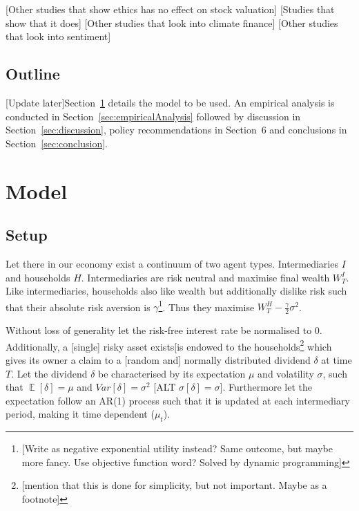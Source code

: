 \documentclass[11pt]{article}
\DeclareMathOperator{\E}{\mathbb{E}} %
\let\cite=\citet
\begin{document}

[Other studies that show ethics has no effect on stock valuation] [Studies that show that it does] [Other studies that look into climate finance] [Other studies that look into sentiment]
\newline
{}

\subsection*{Outline}

[Update later]Section~\ref{sec:model} details the model to be used. An empirical analysis is conducted in Section~\ref{sec:empiricalAnalysis} followed by discussion in Section~\ref{sec:discussion}, policy recommendations in Section~6 and conclusions in Section~\ref{sec:conclusion}.


\section{Model} \label{sec:model}

\subsection*{Setup}

Let there in our economy exist a continuum of two agent types. Intermediaries $I$ and households $H$. Intermediaries are risk neutral and maximise final wealth $W^I_T$. Like intermediaries, households also like wealth but additionally dislike risk such that their absolute risk aversion is $\gamma$\footnote{[Write as negative exponential utility instead? Same outcome, but maybe more fancy. Use objective function word? Solved by dynamic programming]}. Thus they maximise $W^H_T - \frac{\gamma}{2}\sigma^2$.

Without loss of generality let the risk-free interest rate be normalised to 0. Additionally, a [single] risky asset exists[is endowed to the households\footnote{[mention that this is done for simplicity, but not important. Maybe as a footnote]} which gives its owner a claim to a [random and] normally distributed dividend $\delta$ at time $T$. Let the dividend $\delta$ be characterised by its expectation $\mu$ and volatility $\sigma$, such that $\E[\delta] = \mu$ and $Var[\delta] = \sigma^2$ [ALT $\sigma[\delta] = \sigma$]. Furthermore let the expectation follow an AR(1) process such that it is updated at each intermediary period, making it time dependent ($\mu_t$).
\end{document}
